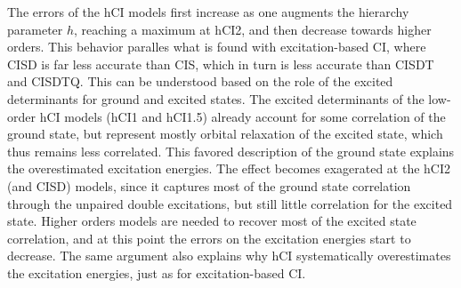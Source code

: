 \documentclass[aip,jcp,reprint,noshowkeys,superscriptaddress]{revtex4-1}
\begin{document}
The errors of the hCI models first increase as one augments the hierarchy parameter $h$, reaching a maximum at hCI2, and then decrease towards higher orders.
This behavior paralles what is found with excitation-based CI, where CISD is far less accurate than CIS, which in turn is less accurate than CISDT and CISDTQ.
This can be understood based on the role of the excited determinants for ground and excited states.
The excited determinants of the low-order hCI models (hCI1 and hCI1.5) already account for some correlation of the ground state,
but represent mostly orbital relaxation of the excited state, which thus remains less correlated.
This favored description of the ground state explains the overestimated excitation energies.
The effect becomes exagerated at the hCI2 (and CISD) models, since it captures most of the ground state correlation through the unpaired double excitations,
but still little correlation for the excited state.
Higher orders models are needed to recover most of the excited state correlation, and at this point the errors on the excitation energies start to decrease.
The same argument also explains why hCI systematically overestimates the excitation energies, just as for excitation-based CI.

\end{document}
